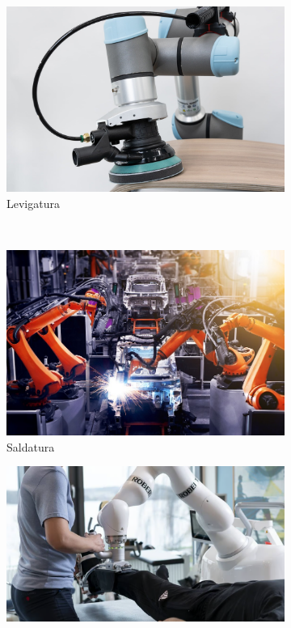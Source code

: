 \begin{figure}[H]
    \centering
    \begin{subfigure}[b]{0.25\textwidth}
        \includegraphics[width=\textwidth]{images/polishing.jpg}
        \caption{Levigatura}
        \label{fig:polishing}
    \end{subfigure}
    ~ %
    \begin{subfigure}[b]{0.25\textwidth}
        \includegraphics[width=\textwidth]{images/welding.jpeg}
        \caption{Saldatura}
        \label{fig:welding}
    \end{subfigure}
    \begin{subfigure}[b]{0.3\textwidth}
        \includegraphics[width=\textwidth]{images/rehabilitation.png}

\end{subfigure}
\end{figure}
